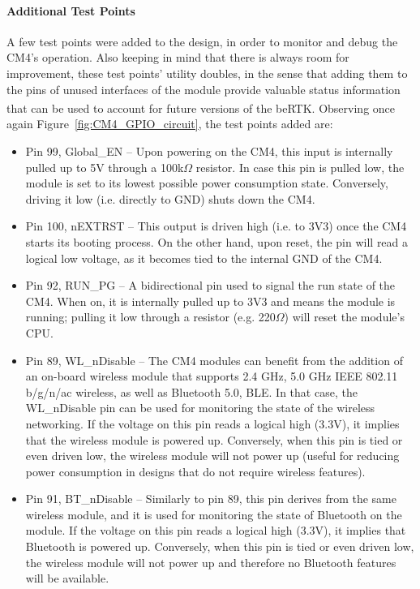 \paragraph{Additional Test Points}	A few test points were added to the design, in order to monitor and debug the CM4's operation.
Also keeping in mind that there is always room for improvement, these test points' utility doubles, in the sense that adding them to the pins of unused interfaces of the module provide valuable status information that can be used to account for future versions of the beRTK\textsuperscript{\textregistered}.
Observing once again Figure~\ref{fig:CM4_GPIO_circuit}, the test points added are:
\begin{itemize}
	\item Pin 99, Global\_EN -- Upon powering on the CM4, this input is internally pulled up to 5V through a 100k$\Omega$ resistor. In case this pin is pulled low, the module is set to its lowest possible power consumption state. Conversely, driving it low (i.e. directly to GND) shuts down the CM4.
	
	\item Pin 100, nEXTRST -- This output is driven high (i.e. to 3V3) once the CM4 starts its booting process. On the other hand, upon reset, the pin will read a logical low voltage, as it becomes tied to the internal GND of the CM4.
	
	\item Pin 92, RUN\_PG -- A bidirectional pin used to signal the run state of the CM4. When on, it is internally pulled up to 3V3 and means the module is running; pulling it low through a resistor (e.g. 220$\Omega$) will reset the module's CPU.

	\item Pin 89, WL\_nDisable -- The CM4 modules can benefit from the addition of an on-board wireless module that supports 2.4 GHz, 5.0 GHz IEEE 802.11 b/g/n/ac wireless, as well as Bluetooth 5.0, BLE. In that case, the WL\_nDisable pin can be used for monitoring the state of the wireless networking. If the voltage on this pin reads a logical high (3.3V), it implies that the wireless module is powered up. Conversely, when this pin is tied or even driven low, the wireless module will not power up (useful for reducing power consumption in designs that do not require wireless features).

	\item Pin 91, BT\_nDisable -- Similarly to pin 89, this pin derives from the same wireless module, and it is used for monitoring the state of Bluetooth on the module. If the voltage on this pin reads a logical high (3.3V), it implies that Bluetooth is powered up. Conversely, when this pin is tied or even driven low, the wireless module will not power up and therefore no Bluetooth features will be available.
	

\end{itemize}
